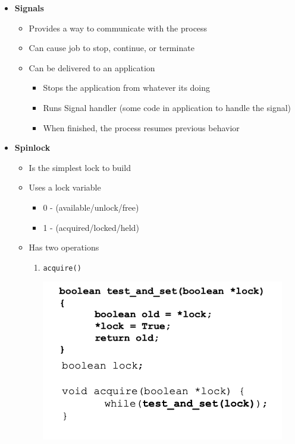 \documentclass[12pt]{article}
\begin{document}
\begin{enumerate}[1.]
\begin{itemize}
\begin{itemize}
        \end{itemize}

        \item \textbf{Signals}

        \begin{itemize}
            \item Provides a way to communicate with the process
            \item Can cause job to stop, continue, or terminate
            \item Can be delivered to an application

            \begin{itemize}
                \item Stops the application from whatever its doing
                \item Runs Signal handler (some code in application to handle the signal)
                \item When finished, the process resumes previous behavior
            \end{itemize}
        \end{itemize}

        \item \textbf{Spinlock}
        \begin{itemize}
            \item Is the simplest lock to build
            \item Uses a lock variable

            \begin{itemize}
                \item 0 - (available/unlock/free)
                \item 1 - (acquired/locked/held)
            \end{itemize}

            \item Has two operations

            \begin{enumerate}[1.]
                \item \texttt{acquire()}

                \bigskip

                \begin{center}
                \includegraphics[width=0.7\linewidth]{images/midterm_2_solution_3.png}
                \end{center}


\end{enumerate}
\end{itemize}
\end{itemize}
\end{enumerate}
\end{document}
